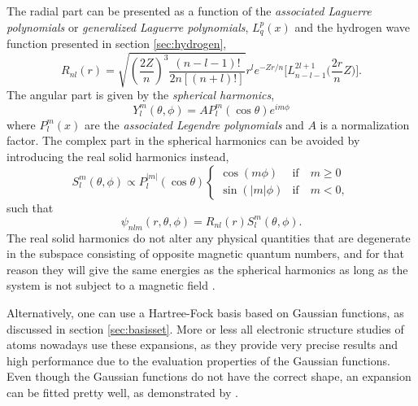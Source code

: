 The radial part can be presented as a function of the \textit{associated Laguerre polynomials} or \textit{generalized Laguerre polynomials}, $L_{q}^p(x)$ and the hydrogen wave function presented in section \ref{sec:hydrogen},
\begin{equation}
R_{nl}(r)=\sqrt{\left(\frac{2Z}{n}\right)^3\frac{(n-l-1)!}{2n[(n+l)!]}} r^le^{-Zr/n}\Big[L_{n-l-1}^{2l+1}\Big(\frac{2r}{n}Z\Big)\Big].
\end{equation}
The angular part is given by the \textit{spherical harmonics},
\begin{equation}
Y_l^m(\theta,\phi)=A P_l^m(\cos\theta)e^{im\phi}
\end{equation}
where $P_l^m(x)$ are the \textit{associated Legendre polynomials} and $A$ is a normalization factor. The complex part in the spherical harmonics can be avoided by introducing the real solid harmonics instead,
\begin{equation}
\label{eq:V_ext}
S_l^m(\theta,\phi)\propto P_l^{|m|}(\cos\theta)
\begin{cases} 
\cos(m\phi) & \text{if} \quad m\geq0 \\
\sin(|m|\phi) & \text{if} \quad m<0,
\end{cases}
\end{equation}
such that
\begin{equation}
\psi_{nlm}(r,\theta,\phi)= R_{nl}(r)S_l^m(\theta,\phi).
\label{eq:hydrogenlikesolid}
\end{equation}
The real solid harmonics do not alter any physical quantities that are degenerate in the subspace consisting of opposite magnetic quantum numbers, and for that reason they will give the same energies as the spherical harmonics as long as the system is not subject to a magnetic field \cite{morten_hjorth-jensen_computational_2019}.

Alternatively, one can use a Hartree-Fock basis based on Gaussian functions, as discussed in section \ref{sec:basisset}. More or less all electronic structure studies of atoms nowadays use these expansions, as they provide very precise results and high performance due to the evaluation properties of the Gaussian functions. Even though the Gaussian functions do not have the correct shape, an expansion can be fitted pretty well, as demonstrated by \citet{hehre_selfconsistent_1969}.

